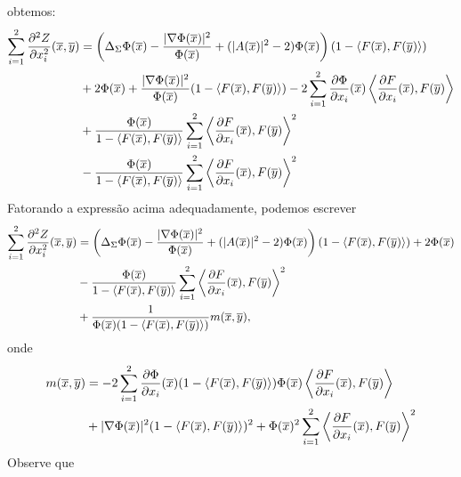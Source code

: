 \begin{demonstracao}
\[	\]
	obtemos:
	\begin{eqnarray*}
		\begin{aligned}
			\sum_{i=1}^2 \frac{\partial^2 Z}{\partial x_i^2}(\overline{x},\overline{y}) &=
			\left(\Delta_{\Sigma} \Phi(\overline{x}) - \frac{|\nabla \Phi(\overline{x})|^2}{\Phi(\overline{x})} + (|A(\overline{x})|^2 - 2)\Phi(\overline{x})\right)(1 - \langle F(\overline{x}), F(\overline{y}) \rangle) \\
			&+ 2 \Phi(\overline{x}) + \frac{|\nabla \Phi(\overline{x})|^2}{\Phi(\overline{x})} (1 - \langle F(\overline{x}), F(\overline{y}) \rangle) - 2 \sum_{i=1}^2 \frac{\partial \Phi}{\partial x_i}(\overline{x}) \left\langle \frac{\partial F}{\partial x_i}(\overline{x}), F(\overline{y}) \right\rangle \\
			&+ \frac{\Phi(\overline{x})}{1 - \langle F(\overline{x}),F(\overline{y}) \rangle} \sum_{i=1}^2 \left\langle \frac{\partial F}{\partial x_i} (\overline{x}), F(\overline{y}) \right\rangle^2 \\
			& - \frac{\Phi(\overline{x})}{1 - \langle F(\overline{x}),F(\overline{y}) \rangle} \sum_{i=1}^2
			\left\langle \frac{\partial F}{\partial x_i} (\overline{x}), F(\overline{y}) \right\rangle^2
		\end{aligned}
	\end{eqnarray*}
	Fatorando a express\~ao acima adequadamente, podemos escrever
	\begin{eqnarray*}
		\begin{aligned}
			\sum_{i=1}^2 \frac{\partial^2 Z}{\partial x_i^2}(\overline{x},\overline{y}) &= \left(\Delta_{\Sigma} \Phi(\overline{x}) - \frac{|\nabla \Phi(\overline{x})|^2}{\Phi(\overline{x})} + (|A(\overline{x})|^2 - 2)\Phi(\overline{x})\right)(1 - \langle F(\overline{x}), F(\overline{y}) \rangle)+ 2 \Phi(\overline{x})	\\
			& - \frac{\Phi(\overline{x})}{1 - \langle F(\overline{x}),F(\overline{y}) \rangle} \sum_{i=1}^2 \left\langle \frac{\partial F}{\partial x_i} (\overline{x}), F(\overline{y}) \right\rangle^2 \\
			& + \frac{1}{\Phi(\overline{x})(1 - \langle F(\overline{x}), F(\overline{y}) \rangle)}m(\overline{x},\overline{y}),
		\end{aligned}
	\end{eqnarray*}	
	onde
	\begin{eqnarray*}
		\begin{aligned}
			m(\overline{x},\overline{y}) &= - 2 \sum_{i=1}^2 \frac{\partial \Phi}{\partial x_i}(\overline{x}) 
			(1 - \langle F(\overline{x}), F(\overline{y}) \rangle) \Phi(\overline{x}) \left\langle \frac{\partial F}
			{\partial x_i}(\overline{x}), F(\overline{y}) \right\rangle \\
			&+ |\nabla \Phi(\overline{x})|^2 (1 - \langle F(\overline{x}), F(\overline{y}) \rangle)^2 
			+ \Phi(\overline{x})^2 \sum_{i=1}^2 \left\langle \frac{\partial F}
			{\partial x_i} (\overline{x}), F(\overline{y}) \right\rangle^2
		\end{aligned}
	\end{eqnarray*}	
	Observe que
	\[
\]
\end{demonstracao}
